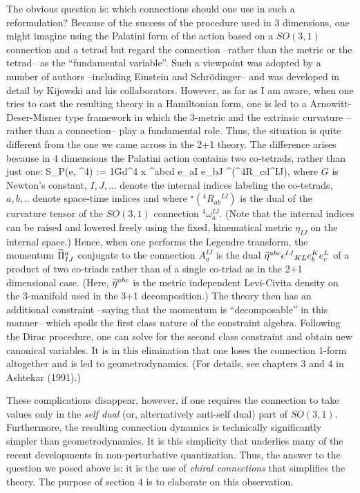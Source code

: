 The obvious question is: which connections should one use in such a
reformulation? Because of the success of the procedure used in 3
dimensions, one might imagine using the Palatini form of the action based
on a $SO(3,1)$ connection and a tetrad but regard the connection --rather
than the metric or the tetrad-- as the ``fundamental variable''. Such a
viewpoint was adopted by a number of authors --including Einstein and
Schr\"odinger-- and was developed in detail by Kijowski and his
collaborators. However, as far as I am aware, when one tries to cast the
resulting theory in a Hamiltonian form, one is led to a Arnowitt-Deser-Misner
type framework in which the 3-metric and the extrinsic curvature --rather than
a connection-- play a fundamental role. Thus, the situation is quite different
from the one we came across in the 2+1 theory. The difference arises because
in 4 dimensions the Palatini action contains two co-tetrads, rather than just
one:
\bneq
 S_P(e, {}^4\!\omega) := {1\over G}\int d{}^4\! x\>\- \tw\eta^{abcd}\-
e_{aI} e_{bJ}\-\> {}^\star({}^4\!R_{cd}{}^{IJ}),
where $G$ is Newton's constant, $I,J,...$ denote the internal indices
labeling the co-tetrads, $a,b,..$ denote space-time indices and where
${}^\star({}^4\!R_{ab}{}^{IJ})$ is the dual of the
curvature tensor of the $SO(3,1)$
connection ${}^4\!\omega_a^{IJ}$. (Note that the internal indices can be
raised and lowered freely using the fixed, kinematical metric $\eta_{IJ}$ on
the internal space.) Hence, when one performs the Legendre transform, the
momentum $\widetilde{\Pi}^a_{IJ}$ conjugate to the connection $A_a^{IJ}$ is the dual
$\widetilde{\eta}^{abc} \epsilon^{IJ}{}_{KL}e_b^K e_c^L$ of a product of two
co-triads rather than of a single co-triad as in the 2+1 dimensional case.
(Here, $\widetilde\eta^{abc}$ is the metric independent Levi-Civita density on the
3-manifold used in the 3+1 decomposition.) The theory then has an additional
constraint --saying that the momentum is ``decomposable'' in this manner--
which spoils the first class nature of the constraint algebra. Following the
Dirac procedure, one can solve for the second class constraint and obtain new
canonical variables. It is in this elimination that one loses the connection
1-form altogether and is led to geometrodynamics. (For details, see chapters
3 and 4 in Ashtekar (1991).)

These complications disappear, however, if one requires the connection
to take values only in the {\it self dual} (or, alternatively anti-self
dual) part of $SO(3,1)$. Furthermore, the resulting connection dynamics
is technically significantly simpler than geometrodynamics. It is this
simplicity that underlies many of the recent developments in
non-perturbative quantization. Thus, the answer to the question we posed
above is: it is the use of {\it chiral connections} that simplifies the
theory. The purpose of section 4 is to elaborate on this observation.

